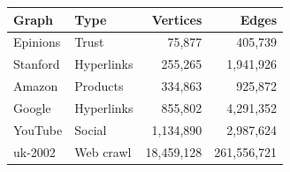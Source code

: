 \begin{tabular}{@{}llrr@{}}
\toprule
Graph & Type & Vertices & Edges \\
\midrule
Epinions & Trust & 75,877 & 405,739 \\
Stanford & Hyperlinks & 255,265 & 1,941,926 \\
Amazon & Products & 334,863 & 925,872 \\
Google & Hyperlinks & 855,802 & 4,291,352 \\
YouTube & Social & 1,134,890 & 2,987,624 \\
uk-2002 & Web crawl & 18,459,128 & 261,556,721 \\
\bottomrule
\end{tabular}
